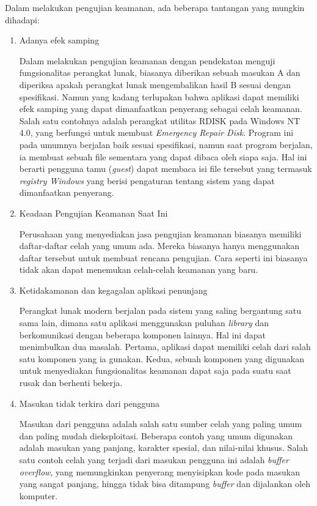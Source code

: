 Dalam melakukan pengujian keamanan, ada beberapa tantangan yang mungkin dihadapi:
\begin{enumerate}
    \item Adanya efek samping
    
    Dalam melakukan pengujian keamanan dengan pendekatan menguji fungsionalitas perangkat lunak,
    biasanya diberikan sebuah masukan A dan diperiksa apakah perangkat lunak mengembalikan
    hasil B sesuai dengan spesifikasi.
    Namun yang kadang terlupakan bahwa aplikasi dapat memiliki efek samping yang dapat dimanfaatkan
    penyerang sebagai celah keamanan. Salah satu contohnya adalah perangkat utilitas 
    RDISK pada Windows NT 4.0,  yang berfungsi untuk membuat \textit{Emergency Repair Disk}.
    Program ini pada umumnya berjalan baik sesuai spesifikasi, namun saat program berjalan,
    ia membuat sebuah file sementara yang dapat dibaca oleh siapa saja.
    Hal ini berarti pengguna tamu (\textit{guest}) dapat membaca isi file tersebut yang
    termasuk \textit{registry Windows} yang berisi pengaturan tentang sistem yang dapat dimanfaatkan penyerang.

    \item Keadaan Pengujian Keamanan Saat Ini

    Perusahaan yang menyediakan jasa pengujian keamanan biasanya memiliki daftar-daftar celah yang umum ada.
    Mereka biasanya hanya menggunakan daftar tersebut untuk membuat rencana pengujian.
    Cara seperti ini biasanya tidak akan dapat menemukan celah-celah keamanan yang baru.

    \item Ketidakamanan dan kegagalan aplikasi penunjang

    Perangkat lunak modern berjalan pada sistem yang saling bergantung satu sama lain,
    dimana satu aplikasi menggunakan puluhan \textit{library} dan berkomunikasi dengan
    beberapa komponen lainnya.
    Hal ini dapat menimbulkan dua masalah.
    Pertama, aplikasi dapat memiliki celah dari salah satu komponen yang ia gunakan.
    Kedua, sebuah komponen yang digunakan untuk menyediakan fungsionalitas keamanan
    dapat saja pada suatu saat rusak dan berhenti bekerja.

    \item Masukan tidak terkira dari pengguna

    Masukan dari pengguna adalah salah satu sumber celah yang paling umum dan paling mudah dieksploitasi.
    Beberapa contoh yang umum digunakan adalah masukan yang panjang, karakter spesial, dan nilai-nilai khusus.
    Salah satu contoh celah yang terjadi dari masukan pengguna ini adalah \textit{buffer overflow},
    yang memungkinkan penyerang menyisipkan kode pada masukan yang sangat panjang,
    hingga tidak bisa ditampung \textit{buffer} dan dijalankan oleh komputer. 


\end{enumerate}
